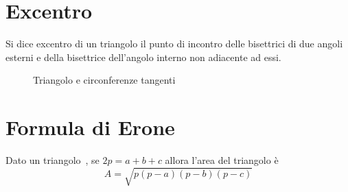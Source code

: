 \section{Excentro}\label{sec:excentro}
\begin{defn}[Exentro]\label{defn:excentro}
Si dice excentro  di un triangolo il punto di incontro delle bisettrici di due angoli esterni e della bisettrice dell'angolo interno non adiacente ad essi.
\end{defn}
\begin{figure}
	\centering
	
	\caption{Triangolo e circonferenze tangenti}
	\label{fig:excentro1}
\end{figure}
\section{Formula di Erone}\label{sec:Formula_Erone}
\begin{thm}
Dato un triangolo~\cite{Dodero1999b}, se $2p=a+b+c$ allora l'area del triangolo è \[A=\sqrt{p(p-a)(p-b)(p-c)}\]
\end{thm}
